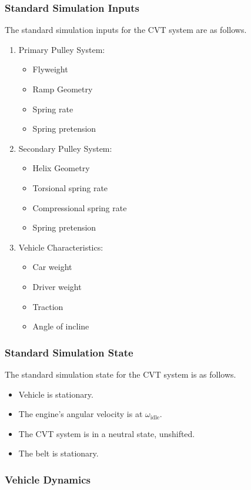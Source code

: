 \documentclass[12pt, titlepage]{article}
\begin{document}
\subsubsection*{Standard Simulation Inputs}
\label{sec:standard_inputs}
The standard simulation inputs for the CVT system are as follows.
\begin{enumerate}
  \item Primary Pulley System:
  \begin{itemize}
    \item Flyweight
    \item Ramp Geometry
    \item Spring rate
    \item Spring pretension
  \end{itemize}
  \item Secondary Pulley System:
  \begin{itemize}
    \item Helix Geometry
    \item Torsional spring rate
    \item Compressional spring rate
    \item Spring pretension
  \end{itemize}
  \item Vehicle Characteristics:
  \begin{itemize}
    \item Car weight
    \item Driver weight
    \item Traction
    \item Angle of incline
  \end{itemize}
\end{enumerate}

\subsubsection*{Standard Simulation State}
\label{sec:standard_state}
The standard simulation state for the CVT system is as follows.
\begin{itemize}
  \item Vehicle is stationary.
  \item The engine's angular velocity is at $\omega_\text{idle}$.
  \item The CVT system is in a neutral state, unshifted.
  \item The belt is stationary.
\end{itemize}

\subsubsection{Vehicle Dynamics}
\end{document}
